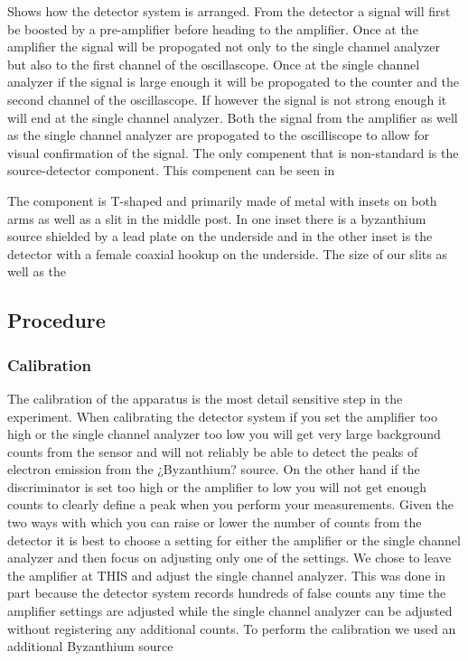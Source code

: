 
Shows how the detector system is arranged.  From the detector a signal will first be boosted by a pre-amplifier before heading to the amplifier. Once at the amplifier the signal will be propogated not only to the single channel analyzer but also to the first channel of the  oscillascope.  Once at the single channel analyzer if the signal is large enough it will be propogated to the counter and the second channel of the oscillascope. If however the signal is not strong enough it will end at the single channel analyzer. Both the signal from the amplifier as well as the single channel analyzer are propogated to the oscilliscope to allow for visual confirmation of the signal.  
\indent The only compenent that is non-standard is the source-detector component.  This compenent can be seen in
 

The component is T-shaped and primarily made of metal with insets on both arms as well as a slit in the middle post.  In one inset there is a byzanthium source shielded by a lead plate on the underside and in the other inset is the detector with a female coaxial hookup on the underside.  The size of our slits as well as the    

 
\subsection{Procedure}

\subsubsection{Calibration}
\indent The calibration of the apparatus is the most detail sensitive step in the experiment.  When calibrating the detector system if you set the amplifier too high or the single channel analyzer too low you will get very large background counts from the sensor and will not reliably be able to detect the peaks of electron emission from the ¿Byzanthium? source.  On the other hand if the discriminator is set too high or the amplifier to low you will not get enough counts to clearly define a peak when you perform your measurements. Given the two ways with which you can raise or lower the number of counts from the detector it is best to choose a setting for either the amplifier or the single channel analyzer and then focus on adjusting only one of the settings.  We chose to leave the amplifier at THIS and adjust the single channel analyzer.  This was done in part because the detector system records hundreds of false counts any time the amplifier settings are adjusted while the single channel analyzer can be adjusted without registering any additional counts. To perform the calibration we used an additional Byzanthium source  

